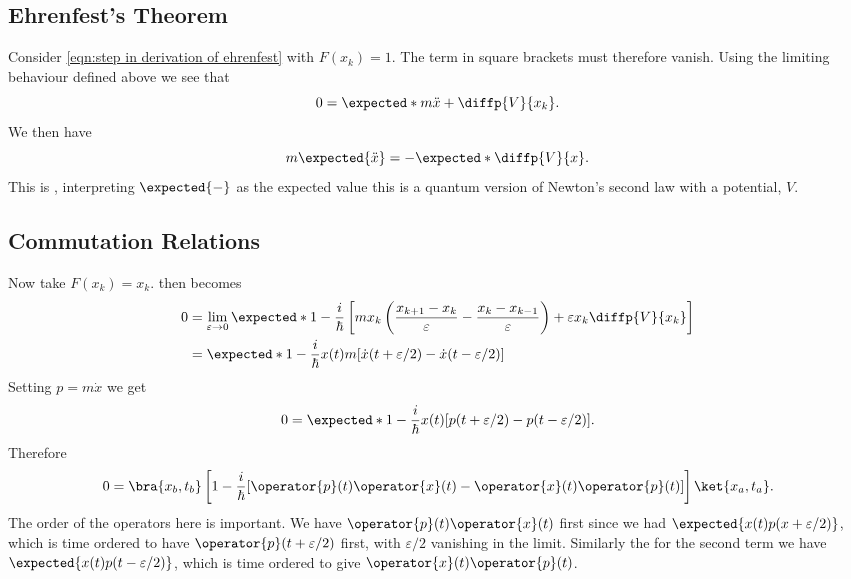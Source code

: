 \documentclass[fleqn]{NotesClass}
\begin{document}
    \subsection{Ehrenfest's Theorem}
    Consider \cref{eqn:step in derivation of ehrenfest} with \(F(x_k) = 1\).
    The term in square brackets must therefore vanish.
    Using the limiting behaviour defined above we see that
    \begin{equation}
        0 = \expected*{m\ddot{x} + \diffp{V}{x_k}}.
    \end{equation}
    We then have
    \begin{equation}
        m\expected{\ddot{x}} = -\expected*{\diffp{V}{x}}.
    \end{equation}
    This is , interpreting \(\expected{-}\) as the expected value this is a quantum version of Newton's second law with a potential, \(V\).
    
    \subsection{Commutation Relations}
    Now take \(F(x_k) = x_k\).
     then becomes
    \begin{align}\label{eqn:step in derivation of commutation relations}
        0 &= \lim_{\varepsilon\to 0} \expected*{1 - \frac{i}{\hbar}\left[ mx_k \left( \frac{x_{k+1} - x_k}{\varepsilon} - \frac{x_k - x_{k-1}}{\varepsilon} \right) + \varepsilon x_k \diffp{V}{x_k} \right]}\\
        &= \expected*{1 - \frac{i}{\hbar}x(t)m[\dot{x}(t + \varepsilon/2) - \dot{x}(t - \varepsilon/2)]}
    \end{align}
    Setting \(p = m\dot{x}\) we get
    \begin{equation}
        0 = \expected*{1 - \frac{i}{\hbar}x(t)[p(t + \varepsilon/2) - p(t - \varepsilon/2)]}.
    \end{equation}
    Therefore
    \begin{align}
        0 = \bra{x_b, t_b} \left[ 1 - \frac{i}{\hbar}[\operator{p}(t)\operator{x}(t) - \operator{x}(t)\operator{p}(t)] \right]\ket{x_a, t_a}.
    \end{align}
    The order of the operators here is important.
    We have \(\operator{p}(t)\operator{x}(t)\) first since we had \(\expected{x(t)p(x + \varepsilon/2)}\), which is time ordered to have \(\operator{p}(t + \varepsilon/2)\) first, with \(\varepsilon/2\) vanishing in the limit.
    Similarly the for the second term we have \(\expected{x(t)p(t - \varepsilon/2)}\), which is time ordered to give \(\operator{x}(t)\operator{p}(t)\).
    
\end{document}
